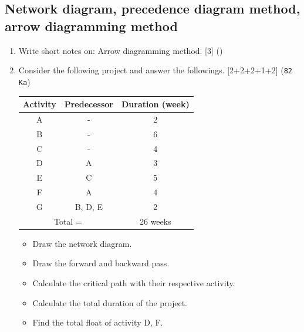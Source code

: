 \documentclass[12pt]{article}
\begin{document}
  \subsection{Network diagram, precedence diagram method, arrow diagramming method}
    \begin{enumerate}
      \item Write short notes on: Arrow diagramming method. \hfill [3] ()

      \item Consider the following project and answer the followings. \hfill [2+2+2+1+2] (\texttt{82 Ka})\\
        \begin{tabular}{|c|c|c|}
          \hline
          Activity & Predecessor & Duration (week)\\ \hline
          A & - & 2 \\ \hline
          B & - & 6 \\ \hline
          C & - & 4 \\ \hline
          D & A & 3 \\ \hline
          E & C & 5 \\ \hline
          F & A & 4 \\ \hline
          G & B, D, E & 2 \\ \hline
          \multicolumn{2}{|c|}{Total =} & 26 weeks \\ \hline
        \end{tabular}
        \begin{itemize}[noitemsep]
          \item Draw the network diagram.
          \item Draw the forward and backward pass.
          \item Calculate the critical path with their respective activity.
          \item Calculate the total duration of the project.
          \item Find the total float of activity D, F.
        \end{itemize}


\end{enumerate}
\end{document}
